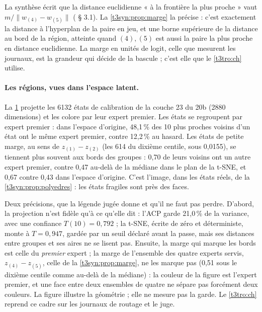 \begin{remarque}
La synthèse écrit que la distance euclidienne « à la frontière la plus proche » vaut $m/\|w_{(4)} - w_{(5)}\|$ ( § 3.1). La \cref{t3syn:prop:marge} la précise : c'est exactement la distance à l'hyperplan de la paire en jeu, et une borne supérieure de la distance au bord de la région, atteinte quand $(4), (5)$ est aussi la paire la plus proche en distance euclidienne. La marge en unités de logit, celle que mesurent les journaux, est la grandeur qui décide de la bascule ; c'est elle que le \cref{t3tro:ch} utilise.
\end{remarque}

\begin{figure}[tbp]
\centering
\GrapheLatentsEtats
{}
\label{fig:t3-lat-etats}
\end{figure}

\paragraph{Les régions, vues dans l'espace latent.} La \cref{fig:t3-lat-etats} projette les \num{6132} états de calibration de la couche 23 du 20b (\num{2880} dimensions) et les colore par leur expert premier. Les états se regroupent par expert premier : dans l'espace d'origine, 48,1\,\% des 10 plus proches voisins d'un état ont le même expert premier, contre 12,2\,\% au hasard. Les états de petite marge, au sens de $z_{(1)} - z_{(2)}$ (les 614 du dixième centile, sous 0,0155), se tiennent plus souvent aux bords des groupes : 0,70 de leurs voisins ont un autre expert premier, contre 0,47 au-delà de la médiane dans le plan de la t-SNE, et 0,67 contre 0,43 dans l'espace d'origine. C'est l'image, dans les états réels, de la \cref{t3syn:prop:polyedres} : les états fragiles sont près des faces.

Deux précisions, que la légende jugée donne et qu'il ne faut pas perdre. D'abord, la projection n'est fidèle qu'à ce qu'elle dit : l'ACP garde 21,0\,\% de la variance, avec une confiance $T(10) = 0{,}792$ ; la t-SNE, écrite de zéro et déterministe, monte à $T = 0{,}947$, gardée par un seuil déclaré avant la passe, mais ses distances entre groupes et ses aires ne se lisent pas. Ensuite, la marge qui marque les bords est celle du \emph{premier} expert ; la marge de l'ensemble des quatre experts servis, $z_{(4)} - z_{(5)}$, celle de la \cref{t3syn:prop:marge}, ne les marque pas (0,51 sous le dixième centile comme au-delà de la médiane) : la couleur de la figure est l'expert premier, et une face entre deux ensembles de quatre ne sépare pas forcément deux couleurs. La figure illustre la géométrie ; elle ne mesure pas la garde. Le \cref{t3tro:ch} reprend ce cadre sur les journaux de routage et le juge.

